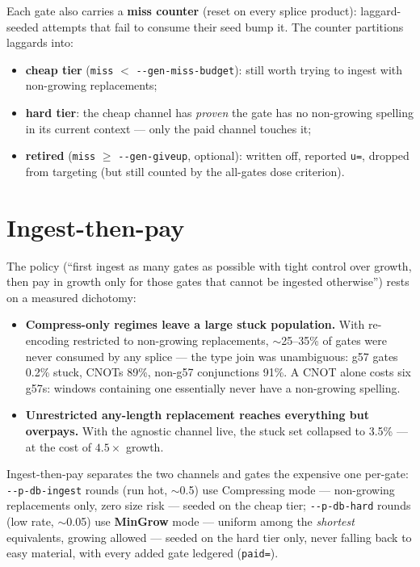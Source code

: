 \documentclass[11pt]{article}
\newcommand{\code}[1]{\texttt{#1}}
\begin{document}
Each gate also carries a \textbf{miss counter} (reset on every splice
product): laggard-seeded attempts that fail to consume their seed bump it.
The counter partitions laggards into:
\begin{itemize}
\item \textbf{cheap tier} (\code{miss} $<$ \code{-{}-gen-miss-budget}): still
worth trying to ingest with non-growing replacements;
\item \textbf{hard tier}: the cheap channel has \emph{proven} the gate has
no non-growing spelling in its current context --- only the paid channel
touches it;
\item \textbf{retired} (\code{miss} $\geq$ \code{-{}-gen-giveup}, optional):
written off, reported \code{u=}, dropped from targeting (but still counted
by the all-gates dose criterion).
\end{itemize}

\section{Ingest-then-pay}
The policy (``first ingest as many gates as possible with tight control
over growth, then pay in growth only for those gates that cannot be
ingested otherwise'') rests on a measured dichotomy:
\begin{itemize}
\item \textbf{Compress-only regimes leave a large stuck population.} With
re-encoding restricted to non-growing replacements, $\sim$25--35\% of gates
were never consumed by any splice --- the type join was unambiguous: g57
gates 0.2\% stuck, CNOTs 89\%, non-g57 conjunctions 91\%. A CNOT alone
costs six g57s: windows containing one essentially never have a non-growing
spelling.
\item \textbf{Unrestricted any-length replacement reaches everything but
overpays.} With the agnostic channel live, the stuck set collapsed to
3.5\% --- at the cost of $4.5\times$ growth.
\end{itemize}
Ingest-then-pay separates the two channels and gates the expensive one
per-gate: \code{-{}-p-db-ingest} rounds (run hot, $\sim$0.5) use Compressing
mode --- non-growing replacements only, zero size risk --- seeded on the
cheap tier; \code{-{}-p-db-hard} rounds (low rate, $\sim$0.05) use
\textbf{MinGrow} mode --- uniform among the \emph{shortest} equivalents,
growing allowed --- seeded on the hard tier only, never falling back to
easy material, with every added gate ledgered (\code{paid=}).
\end{document}
